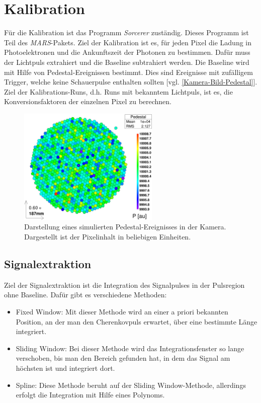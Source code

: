 \section{Kalibration}
\label{sec:Calibration}
Für die Kalibration ist das Programm \textit{Sorcerer} zuständig. 
Dieses Programm ist Teil des \textit{MARS}-Pakets.
Ziel der Kalibration ist es, für jeden Pixel die Ladung in Photoelektronen und die Ankunftszeit der Photonen zu bestimmen.
Dafür muss der Lichtpuls extrahiert und die Baseline subtrahiert werden.
Die Baseline wird mit Hilfe von Pedestal-Ereignissen bestimmt. 
Dies sind Ereignisse mit zufälligem Trigger, welche keine Schauerpulse enthalten sollten [vgl. \autoref{Kamera-Bild-Pedestal}].
Ziel der Kalibrations-Runs, d.h.  Runs mit bekanntem Lichtpuls, ist es, die Konversionsfaktoren der einzelnen Pixel zu berechnen.

\begin{figure}
    \centering
    \includegraphics[width=0.6\textwidth]{./Plots/03_MonteCarlos/Pedestal_fertig.png}
    \caption{Darstellung eines simulierten Pedestal-Ereignisses in der Kamera. Dargestellt ist der Pixelinhalt in beliebigen Einheiten.}
    \label{Kamera-Bild-Pedestal}
\end{figure}


\subsection{Signalextraktion}
Ziel der Signalextraktion ist die Integration des Signalpulses in der Pulsregion ohne Baseline.
Dafür gibt es verschiedene Methoden:
\begin{itemize}
 \item Fixed Window: Mit dieser Methode wird an einer a priori bekannten Position, an der man den Cherenkovpuls erwartet, über eine bestimmte Länge integriert.
 \item Sliding Window: Bei dieser Methode wird das Integrationsfenster so lange verschoben, bis man den Bereich gefunden hat, in dem das Signal am höchsten ist und integriert dort.
 \item Spline: Diese Methode beruht auf der Sliding Window-Methode, allerdings erfolgt die Integration mit Hilfe eines Polynoms.
\end{itemize}

